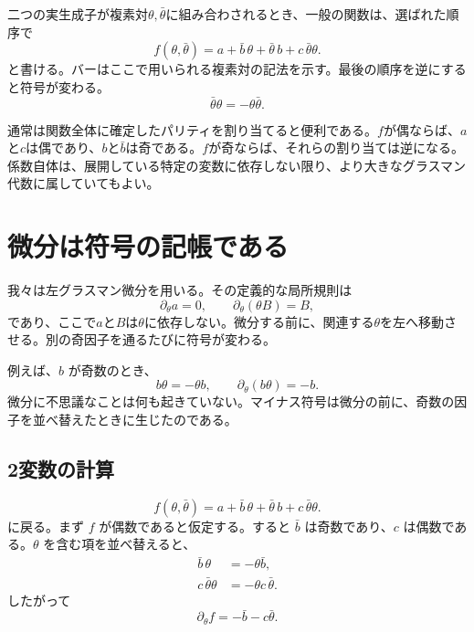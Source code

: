 二つの実生成子が複素対\(\theta,\bar\theta\)に組み合わされるとき、一般の関数は、選ばれた順序で
\begin{equation}
f(\theta,\bar\theta)
=a+\bar b\,\theta+\bar\theta\,b+c\,\bar\theta\theta.
\end{equation}
と書ける。バーはここで用いられる複素対の記法を示す。最後の順序を逆にすると符号が変わる。
\begin{equation}
\bar\theta\theta=-\theta\bar\theta.
\end{equation}

通常は関数全体に確定したパリティを割り当てると便利である。\(f\)が偶ならば、\(a\)と\(c\)は偶であり、\(b\)と\(\bar b\)は奇である。\(f\)が奇ならば、それらの割り当ては逆になる。係数自体は、展開している特定の変数に依存しない限り、より大きなグラスマン代数に属していてもよい。

\begin{classroomqa}
\end{classroomqa}

\section{微分は符号の記帳である}

我々は左グラスマン微分を用いる。その定義的な局所規則は
\begin{equation}
\partial_\theta a=0,
\qquad
\partial_\theta(\theta B)=B,
\end{equation}
であり、ここで\(a\)と\(B\)は\(\theta\)に依存しない。微分する前に、関連する\(\theta\)を左へ移動させる。別の奇因子を通るたびに符号が変わる。

例えば、\(b\) が奇数のとき、
\begin{equation}
b\theta=-\theta b,
\qquad
\partial_\theta(b\theta)=-b.
\end{equation}
微分に不思議なことは何も起きていない。マイナス符号は微分の前に、奇数の因子を並べ替えたときに生じたのである。

\subsection{2変数の計算}


\begin{equation}
f(\theta,\bar\theta)
=a+\bar b\,\theta+\bar\theta\,b+c\,\bar\theta\theta.
\end{equation}
に戻る。まず \(f\) が偶数であると仮定する。すると \(\bar b\) は奇数であり、\(c\) は偶数である。\(\theta\) を含む項を並べ替えると、
\begin{align}
\bar b\,\theta&=-\theta\bar b,\\
c\,\bar\theta\theta&=-\theta c\,\bar\theta.
\end{align}
したがって
\begin{equation}
\partial_\theta f=-\bar b-c\bar\theta.
\end{equation}

